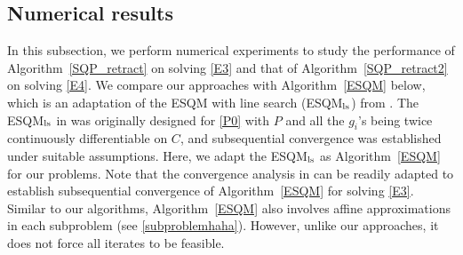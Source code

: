 \documentclass[10pt]{article}
\numberwithin{equation}{section}
\begin{document}
\subsection{Numerical results}
In this subsection, we perform numerical experiments to study the performance of Algorithm~\ref{SQP_retract} on solving \eqref{E3} and that of Algorithm~\ref{SQP_retract2} on solving \eqref{E4}.
We compare our approaches with Algorithm~\ref{ESQM} below, which is an adaptation of the ESQM with line search (ESQM$_{\rm ls}$) from \cite{Au13}. The ESQM$_{\rm ls}$ in \cite{Au13} was originally designed for \eqref{P0} with $P$ and all the $g_i$'s being twice continuously differentiable on $C$, and subsequential convergence was established under suitable assumptions. Here, we adapt the ESQM$_{\rm ls}$ as Algorithm~\ref{ESQM} for our problems. Note that the convergence analysis in \cite{Au13} can be readily adapted to establish subsequential convergence of Algorithm~\ref{ESQM} for solving \eqref{E3}. Similar to our algorithms, Algorithm~\ref{ESQM} also involves affine approximations in each subproblem (see \eqref{subproblemhaha}). However, unlike our approaches, it does not force all iterates to be feasible.
\end{document}

